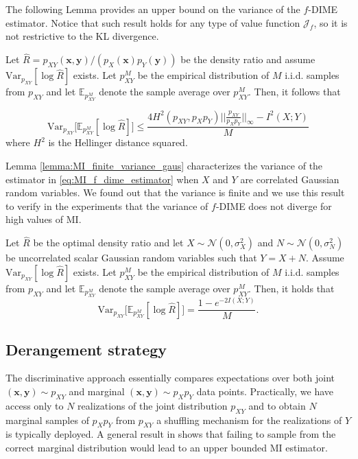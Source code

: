 The following Lemma provides an upper bound on the variance of the $f$-DIME estimator. Notice that such result holds for any type of value function $\mathcal{J}_{f}$, so it is not restrictive to the KL divergence.

\begin{lemma}
\label{lemma:MI_Lemma2}
Let $\hat{R} = p_{XY}(\mathbf{x},\mathbf{y})/ (p_{X}(\mathbf{x}) p_Y(\mathbf{y}))$ be the density ratio and assume $\text{Var}_{p_{XY}}[\log \hat{R}]$ exists. Let $p^M_{XY}$ be the empirical distribution of $M$ i.i.d. samples from $p_{XY}$ and let $\mathbb{E}_{p^M_{XY}}$ denote the sample average over $p^M_{XY}$. Then, it follows that

\begin{equation}
\text{Var}_{p_{XY}}\bigl[\mathbb{E}_{p^M_{XY}} [\log \hat{R}] \bigr] \leq \frac{ 4H^2(p_{XY},p_Xp_Y)\biggl|\biggl|\frac{p_{XY}}{p_Xp_Y}\biggr|\biggr|_{\infty}-I^2(X;Y)}{M}
\end{equation}
where $H^2$ is the Hellinger distance squared.
\end{lemma}

Lemma \ref{lemma:MI_finite_variance_gaus} characterizes the variance of the estimator in \eqref{eq:MI_f_dime_estimator} when $X$ and $Y$ are correlated Gaussian random variables. We found out that the variance is finite and we use this result to verify in the experiments that the variance of $f$-DIME does not diverge for high values of MI.

\begin{lemma}
\label{lemma:MI_finite_variance_gaus}
Let $\hat{R}$ be the optimal density ratio and let  $X\sim \mathcal{N}(0,\sigma_X^2)$ and $N\sim \mathcal{N}(0,\sigma_N^2)$ be uncorrelated scalar Gaussian random variables such that $Y=X+N$. Assume $\text{Var}_{p_{XY}}[\log \hat{R}]$ exists. Let $p^M_{XY}$ be the empirical distribution of $M$ i.i.d. samples from $p_{XY}$ and let $\mathbb{E}_{p^M_{XY}}$ denote the sample average over $p^M_{XY}$. Then, it holds that
\begin{equation}
\label{eq:MI_variance_f_dime}
\text{Var}_{p_{XY}}\bigl[\mathbb{E}_{p^M_{XY}} [\log \hat{R}] \bigr] = \frac{ 1-e^{-2I(X;Y)}}{M}.
\end{equation}
\end{lemma}

\subsection{Derangement strategy}
\label{subsec:mi_derangements}
The discriminative approach essentially compares expectations over both joint $(\mathbf{x},\mathbf{y}) \sim p_{XY}$ and marginal $(\mathbf{x},\mathbf{y}) \sim p_{X}p_Y$ data points. 
Practically, we have access only to $N$ realizations of the joint distribution $p_{XY}$ and to obtain $N$ marginal samples of $p_Xp_Y$ from $p_{XY}$ a shuffling mechanism for the realizations of $Y$ is typically deployed. A general result in \cite{McAllester2019} shows that failing to sample from the correct marginal distribution would lead to an upper bounded MI estimator.

